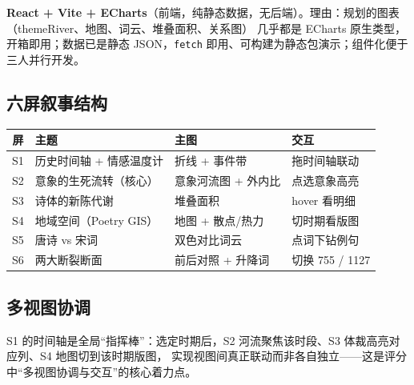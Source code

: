 \textbf{React + Vite + ECharts}（前端，纯静态数据，无后端）。理由：规划的图表（themeRiver、地图、词云、堆叠面积、关系图）
几乎都是 ECharts 原生类型，开箱即用；数据已是静态 JSON，\texttt{fetch} 即用、可构建为静态包演示；组件化便于三人并行开发。

\subsection{六屏叙事结构}

\begin{table}[H]
\centering
\renewcommand{\arraystretch}{1.25}
\begin{tabular}{c l l l}
\toprule
屏 & 主题 & 主图 & 交互 \\
\midrule
S1 & 历史时间轴 + 情感温度计 & 折线 + 事件带 & 拖时间轴联动 \\
S2 & 意象的生死流转（核心） & 意象河流图 + 外内比 & 点选意象高亮 \\
S3 & 诗体的新陈代谢 & 堆叠面积 & hover 看明细 \\
S4 & 地域空间（Poetry GIS） & 地图 + 散点/热力 & 切时期看版图 \\
S5 & 唐诗 vs 宋词 & 双色对比词云 & 点词下钻例句 \\
S6 & 两大断裂断面 & 前后对照 + 升降词 & 切换 755 / 1127 \\
\bottomrule
\end{tabular}
\end{table}

\subsection{多视图协调}

S1 的时间轴是全局“指挥棒”：选定时期后，S2 河流聚焦该时段、S3 体裁高亮对应列、S4 地图切到该时期版图，
实现视图间真正联动而非各自独立——这是评分中“多视图协调与交互”的核心着力点。
